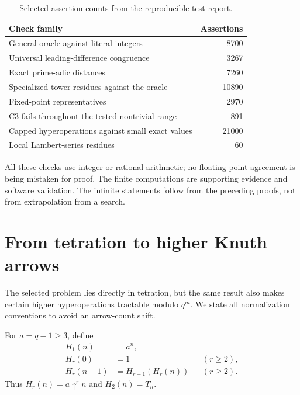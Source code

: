 \documentclass[11pt,a4paper]{article}
\numberwithin{equation}{section}
\theoremstyle{plain}
\theoremstyle{definition}
\begin{document}
\begin{table}[ht]
\centering
\caption{Selected assertion counts from the reproducible test report.}
\begin{tabular}{l r}
\toprule
Check family & Assertions\\
\midrule
General oracle against literal integers&8700\\
Universal leading-difference congruence&3267\\
Exact prime-adic distances&7260\\
Specialized tower residues against the oracle&10890\\
Fixed-point representatives&2970\\
C3 fails throughout the tested nontrivial range&891\\
Capped hyperoperations against small exact values&21000\\
Local Lambert-series residues&60\\
\bottomrule
\end{tabular}
\end{table}

All these checks use integer or rational arithmetic; no floating-point
agreement is being mistaken for proof.  The finite computations are
supporting evidence and software validation.  The infinite statements
follow from the preceding proofs, not from extrapolation from a search.

\section{From tetration to higher Knuth arrows}\label{sec:arrows}

The selected problem lies directly in tetration, but the same result
also makes certain higher hyperoperations tractable modulo $q^m$.
We state all normalization conventions to avoid an arrow-count shift.

For $a=q-1\ge3$, define
\begin{align*}
 H_1(n)&=a^n,\\
 H_r(0)&=1 &&(r\ge2),\\
 H_r(n+1)&=H_{r-1}(H_r(n)) &&(r\ge2).
\end{align*}
Thus $H_r(n)=a\uparrow^r n$ and $H_2(n)=T_n$.
\end{document}
